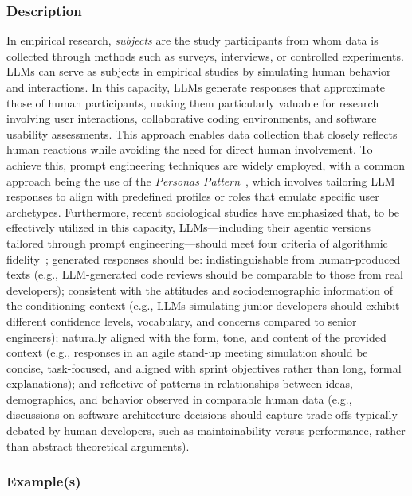 \subsubsection{Description}

In empirical research, \emph{subjects} are the study participants from whom data is collected through methods such as surveys, interviews, or controlled experiments.
LLMs can serve as subjects in empirical studies by simulating human behavior and interactions. In this capacity, LLMs generate responses that approximate those of human participants, making them particularly valuable for research involving user interactions, collaborative coding environments, and software usability assessments. This approach enables data collection that closely reflects human reactions while avoiding the need for direct human involvement.
To achieve this, prompt engineering techniques are widely employed, with a common approach being the use of the \textit{Personas Pattern}~\cite{DBLP:journals/corr/abs-2308-07702}, which involves tailoring LLM responses to align with predefined profiles or roles that emulate specific user archetypes. 
Furthermore, recent sociological studies have emphasized that, to be effectively utilized in this capacity, LLMs—including their agentic versions tailored through prompt engineering—should meet four criteria of algorithmic fidelity~\cite{DBLP:journals/corr/abs-2209-06899}; generated responses should be: indistinguishable from human-produced texts (e.g., LLM-generated code reviews should be comparable to those from real developers); consistent with the attitudes and sociodemographic information of the conditioning context (e.g., LLMs simulating junior developers should exhibit different confidence levels, vocabulary, and concerns compared to senior engineers); naturally aligned with the form, tone, and content of the provided context (e.g., responses in an agile stand-up meeting simulation should be concise, task-focused, and aligned with sprint objectives rather than long, formal explanations); and reflective of patterns in relationships between ideas, demographics, and behavior observed in comparable human data (e.g., discussions on software architecture decisions should capture trade-offs typically debated by human developers, such as maintainability versus performance, rather than abstract theoretical arguments).

\subsubsection{Example(s)}

